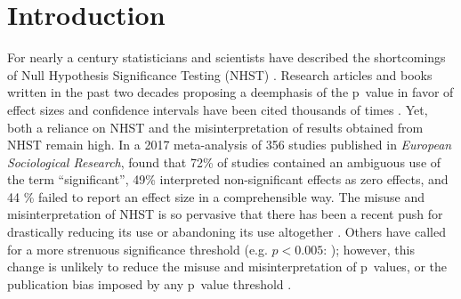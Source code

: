 \flushbottom
\maketitle
\newpage
\thispagestyle{empty}

\section*{Introduction}

For nearly a century statisticians and scientists have described the shortcomings of Null Hypothesis Significance Testing
(NHST) \citep[see][]{Cohen1994}. Research articles and books written in the past two decades proposing a deemphasis of the 
p~value in favor of effect sizes and confidence intervals have been cited thousands of times \citep{Cohen1994, Goodman1999, 
Wilkinson1999, ZiliakandMcCloskey2008, WassersteinandLazar2016}. Yet, both a reliance on NHST and the misinterpretation of 
results obtained from NHST remain high. In a 2017 meta-analysis of 356 studies published in \emph{European Sociological 
Research}, \citet{Bernardietal.2017} found that 72\% of studies contained an ambiguous use of the term ``significant'', 
49\% interpreted non-significant effects as zero effects, and 44 \% failed to report an effect size in a comprehensible 
way. The misuse and misinterpretation of NHST is so pervasive that there has been a recent push for drastically reducing its 
use \citep{SzucsandIoannidis2017} or abandoning its use altogether \citep{McShaneetal.2017}. Others have called for a more
strenuous significance threshold (e.g. $p < 0.005$: \citealt{Benjaminetal.2018}); however, this change is unlikely to reduce
the misuse and misinterpretation of p~values, or the publication bias imposed by any p~value threshold \citep{Ridleyetal.2007}.

